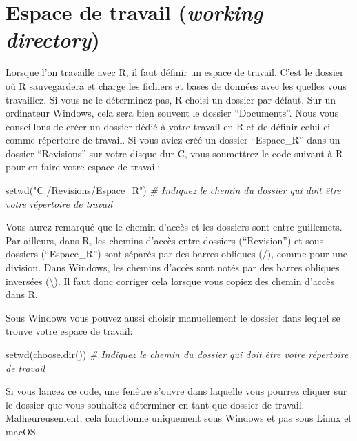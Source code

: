 \documentclass[
]{book}
\newenvironment{Shaded}{\begin{snugshade}}{\end{snugshade}}
\newcommand{\CommentTok}[1]{\textcolor[rgb]{0.56,0.35,0.01}{\textit{#1}}}
\newcommand{\FunctionTok}[1]{\textcolor[rgb]{0.00,0.00,0.00}{#1}}
\newcommand{\NormalTok}[1]{#1}
\newcommand{\StringTok}[1]{\textcolor[rgb]{0.31,0.60,0.02}{#1}}
\begin{document}
\hypertarget{working_directory}{%
\section{\texorpdfstring{Espace de travail (\emph{working directory})}{Espace de travail (working directory)}}\label{working_directory}}

Lorsque l'on travaille avec R, il faut définir un espace de travail. C'est le dossier où R sauvegardera et charge les fichiers et bases de données avec les quelles vous travaillez. Si vous ne le déterminez pas, R choisi un dossier par défaut. Sur un ordinateur Windows, cela sera bien souvent le dossier ``Documents''. Nous vous conseillons de créer un dossier dédié à votre travail en R et de définir celui-ci comme répertoire de travail. Si vous aviez créé un dossier ``Espace\_R'' dans un dossier ``Revisions'' sur votre disque dur C, vous soumettrez le code suivant à R pour en faire votre espace de travail:

\begin{Shaded}
\begin{Highlighting}[]
\FunctionTok{setwd}\NormalTok{(}\StringTok{"C:/Revisions/Espace\_R"}\NormalTok{) }\CommentTok{\# Indiquez le chemin du dossier qui doit être votre répertoire de travail}
\end{Highlighting}
\end{Shaded}

Vous aurez remarqué que le chemin d'accès et les dossiers sont entre guillemets. Par ailleurs, dans R, les chemins d'accès entre dossiers (``Revision'') et sous-dossiers (``Espace\_R'') sont séparés par des barres obliques (/), comme pour une division. Dans Windows, les chemins d'accès sont notés par des barres obliques inversées (\textbackslash). Il faut donc corriger cela lorsque vous copiez des chemin d'accès dans R.

Sous Windows vous pouvez aussi choisir manuellement le dossier dans lequel se trouve votre espace de travail:

\begin{Shaded}
\begin{Highlighting}[]
\FunctionTok{setwd}\NormalTok{(}\FunctionTok{choose.dir}\NormalTok{()) }\CommentTok{\# Indiquez le chemin du dossier qui doit être votre répertoire de travail}
\end{Highlighting}
\end{Shaded}

Si vous lancez ce code, une fenêtre s'ouvre dans laquelle vous pourrez cliquer sur le dossier que vous souhaitez déterminer en tant que dossier de travail. Malheureusement, cela fonctionne uniquement sous Windows et pas sous Linux et macOS.
\end{document}
